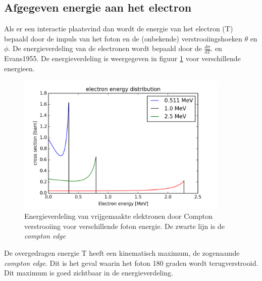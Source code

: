 \documentclass[a4paper,11pt]{article}
\begin{document}
\subsection{Afgegeven energie aan het electron}

Als er een interactie plaatsvind dan wordt de energie van het electron (T) bepaald door de impuls van het foton en de (onbekende) verstrooiingshoeken $\theta$ en $\phi$.  De energieverdeling van de electronen wordt bepaald door de $\frac{d\sigma}{dT}$. \cite{Leo1987} en {Evans1955}. De energieverdeling is weergegeven in figuur \ref{fig:compton_edge} voor verschillende energieen. 

\begin{figure}[t]
  \begin{center}
    \includegraphics[width=0.9\textwidth]{compton_edge.png}
    \caption{\label{fig:compton_edge} Energieverdeling van vrijgemaakte elektronen door Compton verstrooiing voor verschillende foton energie. De zwarte lijn is de \textit{compton edge}}
  \end{center}
\end{figure}


De overgedragen energie T heeft een kinematisch maximum, de zogenaamde \textit{compton edge}. Dit is het geval waarin het foton 180 graden wordt terugverstrooid. Dit maximum is goed zichtbaar in de energieverdeling.
\end{document}
